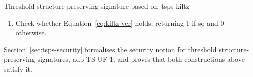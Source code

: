 \begin{protocolbox}{Threshold structure-preserving signature based
  on~\cite{C:KilPanWee15}}{tsps-kiltz}
\begin{description}
  \begin{enumerate}

    \item Check whether Equation~\ref{eq:kiltz-ver} holds, returning 1 if so
      and 0 otherwise.

  \end{enumerate}

\end{description}

\end{protocolbox}

Section~\ref{sec:tsps-security} formalises the security notion for threshold
structure-preserving signatures, adp-TS-UF-1, and proves that both
constructions above satisfy it.
